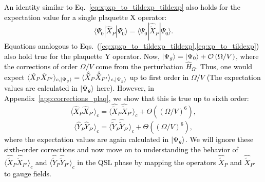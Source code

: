\documentclass[twocolumn,superscriptaddress,amsmath,amssymb,aps,prx,nofootinbib]{revtex4-2}
\newcommand{\newtext}[1]{\textcolor{black}{#1}}
\begin{document}
\newtext{An identity similar to Eq.~\eqref{eq:xpxp_to_tildexp_tildexp} also holds for the expectation value for a single plaquette X operator:
\begin{equation} \label{eq:xp_to_tildexp}
    \langle \Psi_0 | \hat{X}_P | \Psi_0 \rangle  =  \langle \Psi_0 | \hat{\tilde{X}}_P | \Psi_0 \rangle.
\end{equation}
Equations analogous to Eqs.~(\ref{eq:xpxp_to_tildexp_tildexp},\ref{eq:xp_to_tildexp})
also hold true for the plaquette Y operator. 
Now, $\ket{\Psi_g} = \ket{\Psi_0} + \mathcal{O} \left( \Omega/V \right)$, where the corrections of order $\Omega/V$ come from the perturbation $\hat{H}_\Omega$. Thus, one would expect $ \langle \hat{X}_P \hat{X}_{P'} \rangle_{c, \ket{\Psi_g}} = \langle \hat{\tilde{X}}_P \hat{\tilde{X}}_{P'} \rangle_{c, \ket{\Psi_g}} $ up to first order in $\Omega/V$ (The expectation values are calculated in $\ket{\Psi_g}$ here). However, in Appendix~\ref{app:corrections_plaq}, we show that this is true up to sixth order: 
\begin{equation}\label{eq:sixth_order_x}
    \langle \hat{X}_P \hat{X}_{P'} \rangle_c = \langle \hat{\tilde{X}}_P \hat{\tilde{X}}_{P'} \rangle_c + \Theta\left( \left( \Omega/V \right)^6 \right),
\end{equation}
\begin{equation}\label{eq:sixth_order_y}
    \langle \hat{Y}_P \hat{Y}_{P'} \rangle_c = \langle \hat{\tilde{Y}}_P \hat{\tilde{Y}}_{P'} \rangle_c + \Theta\left( \left( \Omega / V \right)^6 \right), 
\end{equation}
where the expectation values are again calculated in $\ket{\Psi_g}$. We will ignore these sixth-order corrections and now move on to understanding the behavior of $\langle \hat{\tilde{X}}_P \hat{\tilde{X}}_{P'} \rangle_c$ and $ \langle \hat{\tilde{Y}}_P \hat{\tilde{Y}}_{P'} \rangle_c$ in the QSL phase by mapping the operators $\hat{\tilde{X}}_{P}$ and $\hat{\tilde{X}}_{P'}$ to gauge fields. }
\end{document}
